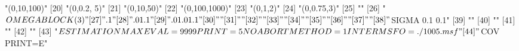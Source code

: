 \begin{Schunk}
\begin{Soutput}
[19] "(0,10,100)"                                                                                  
[20] "(0,0.2, 5)"                                                                                  
[21] "(0,10,50)"                                                                                   
[22] "(0,100,1000)"                                                                                
[23] "(0,1,2)"                                                                                     
[24] "(0,0.75,3)"                                                                                  
[25] ""                                                                                            
[26] "$OMEGA BLOCK(3)"                                                                             
[27] ".1"                                                                                          
[28] ".01 .1"                                                                                      
[29] ".01 .01 .1"                                                                                  
[30] ""                                                                                            
[31] ""                                                                                            
[32] ""                                                                                            
[33] ""                                                                                            
[34] ""                                                                                            
[35] ""                                                                                            
[36] ""                                                                                            
[37] ""                                                                                            
[38] "$SIGMA 0.1 0.1"                                                                              
[39] ""                                                                                            
[40] ""                                                                                            
[41] ""                                                                                            
[42] ""                                                                                            
[43] "$ESTIMATION MAXEVAL=9999 PRINT=5 NOABORT METHOD=1 INTER MSFO=./1005.msf"                     
[44] "$COV PRINT=E"                                                                                

\end{Soutput}
\end{Schunk}
